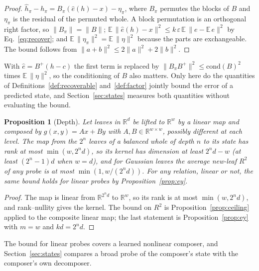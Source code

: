 \documentclass[10pt]{article}
\theoremstyle{plain}
\newtheorem{proposition}{Proposition}
\theoremstyle{remark}
\newcommand{\R}{\mathbb{R}}
\begin{document}
\begin{proof}
$\hat{h}_\pi - h_\pi = B_\pi(\hat{e}(h) - x) - \eta_\pi$, where $B_\pi$ permutes the blocks of $B$ and $\eta_\pi$ is the residual of the permuted whole. A block permutation is an orthogonal right factor, so $\lVert B_\pi \rVert = \lVert B \rVert$; $\mathbb{E}\,\lVert \hat{e}(h) - x \rVert^2 \le k\,\varepsilon\,\mathbb{E}\,\lVert e - \mathbb{E}\,e\rVert^2$ by Eq.~\eqref{eq:recover}; and $\mathbb{E}\,\lVert \eta_\pi \rVert^2 = \mathbb{E}\,\lVert \eta \rVert^2$ because the parts are exchangeable. The bound follows from $\lVert a + b \rVert^2 \le 2\lVert a \rVert^2 + 2\lVert b \rVert^2$.
\end{proof}

\noindent
With $\hat{e} = B^{+}(h - c)$ the first term is replaced by $\lVert B_\pi B^{+} \rVert^2 \le \mathrm{cond}(B)^2$ times $\mathbb{E}\,\lVert \eta \rVert^2$, so the conditioning of $B$ also matters. Only here do the quantities of Definitions~\ref{def:recoverable} and~\ref{def:factor} jointly bound the error of a predicted state, and Section~\ref{sec:states} measures both quantities without evaluating the bound.

\begin{proposition}[Depth]
\label{prop:depth}
Let leaves in $\R^d$ be lifted to $\R^w$ by a linear map and composed by $g(x, y) = Ax + By$ with $A, B \in \R^{w \times w}$, possibly different at each level. The map from the $2^n$ leaves of a balanced whole of depth $n$ to its state has rank at most $\min(w, 2^n d)$, so its kernel has dimension at least $2^n d - w$ (at least $(2^n - 1)d$ when $w = d$), and for Gaussian leaves the average new-leaf $R^2$ of any probe is at most $\min(1, w/(2^n d))$. For any relation, linear or not, the same bound holds for linear probes by Proposition~\ref{prop:ey}.
\end{proposition}

\begin{proof}
The map is linear from $\R^{2^n d}$ to $\R^w$, so its rank is at most $\min(w, 2^n d)$, and rank--nullity gives the kernel. The bound on $R^2$ is Proposition~\ref{prop:ceiling} applied to the composite linear map; the last statement is Proposition~\ref{prop:ey} with $m = w$ and $kd = 2^n d$.
\end{proof}

\noindent
The bound for linear probes covers a learned nonlinear composer, and Section~\ref{sec:states} compares a broad probe of the composer's state with the composer's own decomposer.
\end{document}
